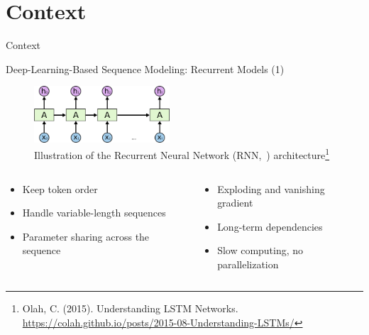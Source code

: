 \documentclass[11pt,aspectratio=169]{beamer}
\begin{document}
\section{Context}

\begin{frame}{Context}

\end{frame}

\begin{frame}{Deep-Learning-Based Sequence Modeling: Recurrent Models (1)}
    \begin{figure}
        \centering
        \includegraphics[width=0.45\textwidth]{RNN-unrolled.png}
        \caption{\centering Illustration of the Recurrent Neural Network (RNN,~\cite{rnn1, rnn2}) architecture\footnote{\tiny Olah, C. (2015). Understanding LSTM Networks. \url{https://colah.github.io/posts/2015-08-Understanding-LSTMs/}}}
    \end{figure}
    \begin{columns}
        \begin{column}{0.5\linewidth}
            \begin{itemize}
                \item {\color{darkgreen}\checkmark} Keep token order
                \item {\color{darkgreen}\checkmark} Handle variable-length sequences
                \item {\color{darkgreen}\checkmark} Parameter sharing across the sequence
            \end{itemize}
        \end{column}
        \begin{column}{0.5\linewidth}
            \begin{itemize}
                \item {\color{red}} Exploding and vanishing gradient
                \item {\color{red}} Long-term dependencies
                \item {\color{red}} Slow computing, no parallelization
            \end{itemize}
        \end{column}
    \end{columns}
\end{frame}
\end{document}
